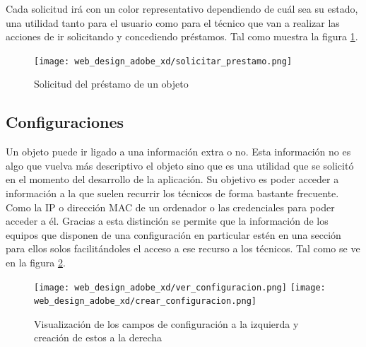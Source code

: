 Cada solicitud irá con un color representativo dependiendo de cuál sea su estado, una utilidad tanto para el usuario como para el técnico que van a realizar las acciones de ir solicitando y concediendo préstamos. Tal como muestra la figura \ref{solicitar_prestamos_design}.

\begin{figure}[h]
    \centering
    \texttt{[image: web\_design\_adobe\_xd/solicitar\_prestamo.png]}
    \caption{Solicitud del préstamo de un objeto}\label{solicitar_prestamos_design}
\end{figure}

\subsection{Configuraciones}

Un objeto puede ir ligado a una información extra o no. Esta información no es algo que vuelva más descriptivo el objeto sino que es una utilidad que se solicitó en el momento del desarrollo de la aplicación. Su objetivo es poder acceder a información a la que suelen recurrir los técnicos de forma bastante frecuente. Como la IP o dirección MAC de un ordenador o las credenciales para poder acceder a él. Gracias a esta distinción se permite que la información de los equipos que disponen de una configuración en particular estén en una sección para ellos solos facilitándoles el acceso a ese recurso a los técnicos. Tal como se ve en la figura \ref{configuracion_design}.

\begin{figure}[h]
    \centering
    \texttt{[image: web\_design\_adobe\_xd/ver\_configuracion.png]}
    \texttt{[image: web\_design\_adobe\_xd/crear\_configuracion.png]}
    \caption{Visualización de los campos de configuración a la izquierda y creación de estos a la derecha}\label{configuracion_design}
\end{figure}